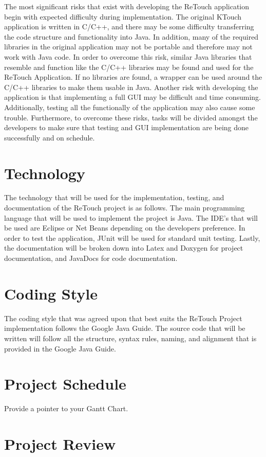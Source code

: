 \documentclass{article}
\begin{document}
    The most significant risks that exist with developing the ReTouch application begin with expected difficulty during implementation. The original KTouch application is written in C/C++, and there may be some difficulty transferring the code structure and functionality into Java. In addition, many of the required libraries in the original application may not be portable and therefore may not work with Java code. In order to overcome this risk, similar Java libraries that resemble and function like the C/C++ libraries may be found and used for the ReTouch Application. If no libraries are found, a wrapper can be used around the C/C++ libraries to make them usable in Java. Another risk with developing the application is that implementing a full GUI may be difficult and time consuming. Additionally, testing all the functionally of the application may also cause some trouble. Furthermore, to overcome these risks, tasks will be divided amongst the developers to make sure that testing and GUI implementation are being done successfully and on schedule.


\section{Technology}

    The technology that will be used for the implementation, testing, and documentation of the ReTouch project is as follows. The main programming language that will be used to implement the project is Java. The IDE's that will be used are Eclipse or Net Beans depending on the developers preference. In order to test the application, JUnit will be used for standard unit testing. Lastly, the documentation will be broken down into Latex and Doxygen for project documentation, and JavaDocs for code documentation.

\section{Coding Style}

    The coding style that was agreed upon that best suits the ReTouch Project implementation follows the Google Java Guide. The source code that will be written will follow all the structure, syntax rules, naming, and alignment that is provided in the Google Java Guide. 

\section{Project Schedule}

Provide a pointer to your Gantt Chart.

\section{Project Review}
\end{document}
